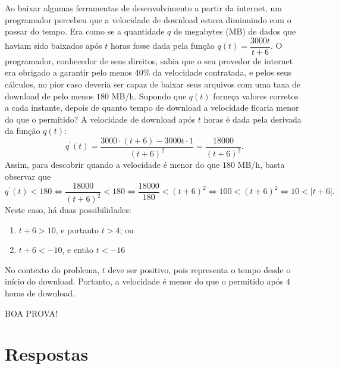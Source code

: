 \documentclass[12pt,a4paper]{article}
\begin{document}
\begin{ExerciseList}
\Exercise[title={2,5}] Ao baixar algumas ferramentas de desenvolvimento a partir da internet, um programador percebeu que a velocidade de download estava diminuindo com o passar do tempo. Era como se a quantidade $q$ de megabytes (MB) de dados que haviam sido baixados após $t$ horas fosse dada pela função $q(t) =\dfrac{3000t}{t + 6}$. O programador, conhecedor de seus direitos, sabia que o seu provedor de internet era obrigado a garantir pelo menos 40\% da velocidade contratada, e pelos seus cálculos, no pior caso deveria ser capaz de baixar seus arquivos com uma taxa de download de pelo menos $180$ MB/h. Supondo que $q(t)$ forneça valores corretos a cada instante, depois de quanto tempo de download a velocidade ficaria menor do que o permitido?
\Answer A velocidade de download após $t$ horas é dada pela derivada da função $q(t)$:
\[
q^\prime(t)
= \frac{3000\cdot (t+6)-3000t \cdot 1}{(t+6)^2}
= \frac{18000}{(t+6)^2}.
\]
Assim, para descobrir quando a velocidade é menor do que $180$ MB/h, basta observar que
\[
q^\prime(t) < 180
\Leftrightarrow
\frac{18000}{(t+6)^2} < 180
\Leftrightarrow
\frac{18000}{180} < (t+6)^2
\Leftrightarrow
100 < (t+6)^2
\Leftrightarrow
10 < |t+6|.
\]
Neste caso, há duas possibilidades:
\begin{enumerate}
\item $t+6 > 10$, e portanto $t>4$; ou
\item $t+6 < -10$, e então $t < -16$
\end{enumerate}
No contexto do problema, $t$ deve ser positivo, pois representa o tempo desde o início do download. Portanto, a velocidade é menor do que o permitido após $4$ horas de download.
\end{ExerciseList}

\begin{center}
BOA PROVA!
\end{center}

\newpage
\restoregeometry
\section*{Respostas}
\shipoutAnswer
\end{document}
